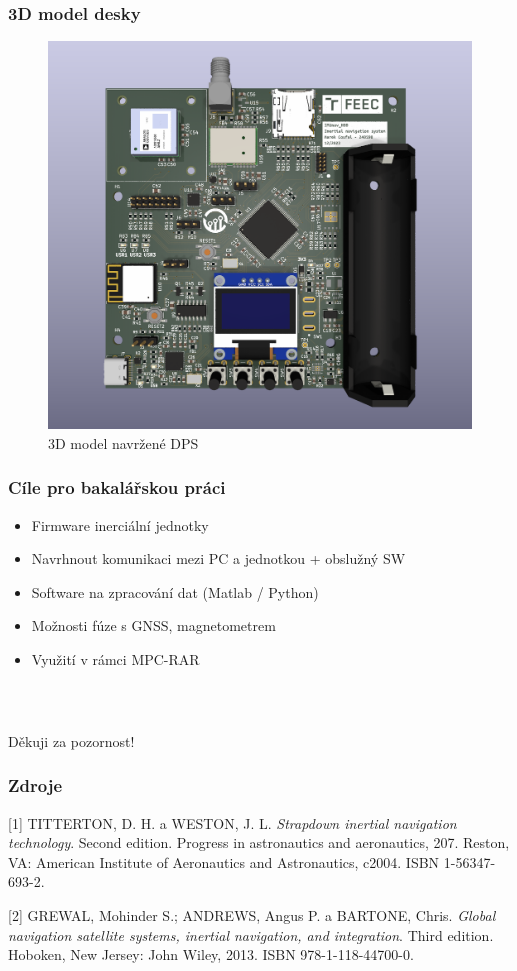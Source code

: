 \documentclass[%
  12pt,       				%
	t,                  %
	aspectratio=1610,   %
	unicode,						%
]{beamer}				    	%
\begin{document}
\begin{frame} 
	\frametitle{3D model desky}
	\begin{figure}%
				\centering
				
				\includegraphics[width=0.5\columnwidth]{KiCad/3Dboard}
				\caption{3D model navržené DPS}%
			\end{figure}
\end{frame}


\begin{frame} 
	\frametitle{Cíle pro bakalářskou práci}
	
	\begin{itemize}
	\item Firmware inerciální jednotky
	\item Navrhnout komunikaci mezi PC a jednotkou + obslužný SW
	\item Software na zpracování dat (Matlab / Python)
	\item Možnosti fúze s GNSS, magnetometrem
	\item Využití v rámci MPC-RAR
	\end{itemize}
\end{frame}


\begin{frame}[c] 
	\frametitle{\mbox{ }}
	\begin{center}
		{\Huge Děkuji za pozornost!}
	\end{center}
\end{frame}

\begin{frame}[c] 
\frametitle{Zdroje}
[1] TITTERTON, D. H. a WESTON, J. L. \textit{Strapdown inertial navigation technology}. Second edition. Progress in astronautics and aeronautics, 207. Reston, VA: American Institute of Aeronautics and Astronautics, c2004. ISBN 1-56347-693-2.

[2] GREWAL, Mohinder S.; ANDREWS, Angus P. a BARTONE, Chris. \textit{Global navigation satellite systems, inertial navigation, and integration}. Third edition. Hoboken, New Jersey: John Wiley, 2013. ISBN 978-1-118-44700-0.
\end{frame}
\end{document}
